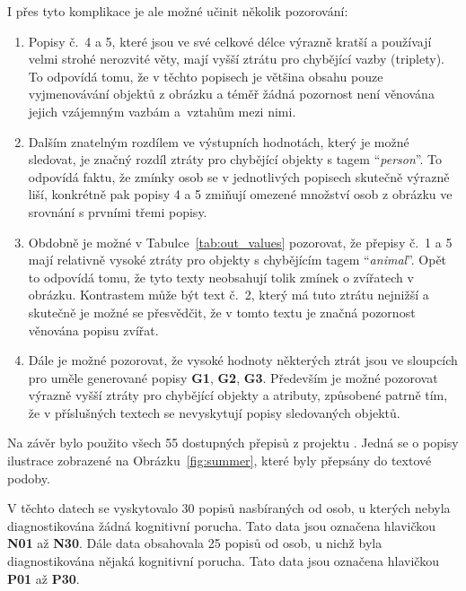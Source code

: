 I přes tyto komplikace je ale možné učinit několik pozorování:
\begin{enumerate}
	\item Popisy č.~4 a 5, které jsou ve své celkové délce výrazně kratší a používají velmi strohé nerozvité věty, mají vyšší ztrátu pro chybějící vazby (triplety).
	      To odpovídá tomu, že v těchto popisech je většina obsahu pouze vyjmenovávání objektů z obrázku a téměř žádná pozornost není věnována
	      jejich vzájemným vazbám a~vztahům mezi nimi.
	\item Dalším znatelným rozdílem ve výstupních hodnotách, který je možné sledovat, je značný rozdíl ztráty pro chybějící objekty s tagem \enquote{\emph{person}}.
	      To odpovídá faktu, že zmínky osob se v jednotlivých popisech skutečně výrazně liší, konkrétně pak popisy 4 a 5 zmiňují omezené množství osob z obrázku ve srovnání s prvními třemi popisy.
	\item Obdobně je možné v Tabulce~\ref{tab:out_values} pozorovat, že přepisy č.~1 a 5 mají relativně vysoké ztráty pro objekty s chybějícím tagem \enquote{\emph{animal}}.
	      Opět to odpovídá tomu, že tyto texty neobsahují tolik zmínek o zvířatech v obrázku.
	      Kontrastem může být text č.~2, který má tuto ztrátu nejnižší a skutečně je možné se přesvědčit, že v tomto textu je značná pozornost věnována popisu zvířat.
	\item Dále je možné pozorovat, že vysoké hodnoty některých ztrát jsou ve sloupcích pro uměle generované popisy \textbf{G1}, \textbf{G2}, \textbf{G3}.
	      Především je možné pozorovat výrazně vyšší ztráty pro chybějící objekty a atributy, způsobené patrně tím, že
	      v příslušných textech se nevyskytují popisy sledovaných objektů.
\end{enumerate}



\clearpage
Na závěr bylo použito všech 55 dostupných přepisů z projektu \projekt{}.
Jedná se o popisy ilustrace zobrazené na Obrázku~\ref{fig:summer}, které byly přepsány do textové podoby.

V těchto datech se vyskytovalo 30 popisů nasbíraných od osob, u kterých nebyla diagnostikována žádná kognitivní porucha.
Tato data jsou označena hlavičkou \textbf{N01} až \textbf{N30}.
Dále data obsahovala 25 popisů od osob, u nichž byla diagnostikována nějaká kognitivní porucha.
Tato data jsou označena hlavičkou \textbf{P01} až \textbf{P30}.

